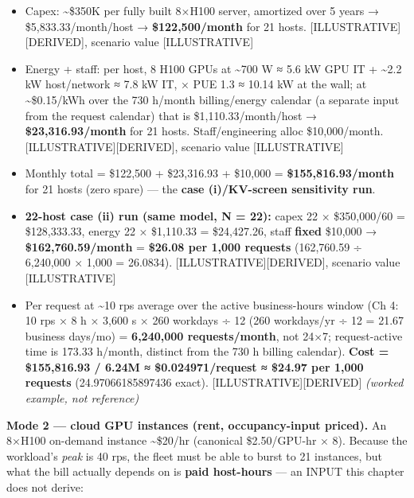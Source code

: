 \begin{itemize}
\tightlist
\item
  Capex: \textasciitilde\$350K per fully built 8×H100 server, amortized
  over 5 years → \$5,833.33/month/host → \textbf{\$122,500/month} for 21
  hosts. \mbox{{[}ILLUSTRATIVE{]}}\hspace{0pt}\mbox{{[}DERIVED{]}}, scenario value
  \mbox{{[}ILLUSTRATIVE{]}}
\item
  Energy + staff: per host, 8 H100 GPUs at \textasciitilde700 W ≈ 5.6 kW
  GPU IT + \textasciitilde2.2 kW host/network ≈ 7.8 kW IT, × PUE 1.3 ≈
  10.14 kW at the wall; at \textasciitilde\$0.15/kWh over the 730
  h/month billing/energy calendar (a separate input from the request
  calendar) that is \$1,110.33/month/host → \textbf{\$23,316.93/month}
  for 21 hosts. Staff/engineering alloc \$10,000/month.
  \mbox{{[}ILLUSTRATIVE{]}}\hspace{0pt}\mbox{{[}DERIVED{]}}, scenario value \mbox{{[}ILLUSTRATIVE{]}}
\item
  Monthly total = \$122,500 + \$23,316.93 + \$10,000 =
  \textbf{\$155,816.93/month} for 21 hosts (zero spare) --- the
  \textbf{case (i)/KV-screen sensitivity run}.
\item
  \textbf{22-host case (ii) run (same model, N = 22):} capex 22 ×
  \$350,000/60 = \$128,333.33, energy 22 × \$1,110.33 = \$24,427.26,
  staff \textbf{fixed} \$10,000 → \textbf{\$162,760.59/month} =
  \textbf{\$26.08 per 1,000 requests} (162,760.59 ÷ 6,240,000 × 1,000 =
  26.0834). \mbox{{[}ILLUSTRATIVE{]}}\hspace{0pt}\mbox{{[}DERIVED{]}}, scenario value
  \mbox{{[}ILLUSTRATIVE{]}}
\item
  Per request at \textasciitilde10 rps average over the active
  business-hours window (Ch 4: 10 rps × 8 h × 3,600 s × 260 workdays ÷
  12 (260 workdays/yr ÷ 12 = 21.67 business days/mo) = \textbf{6,240,000
  requests/month}, not 24×7; request-active time is 173.33 h/month,
  distinct from the 730 h billing calendar). \textbf{Cost = \$155,816.93
  / 6.24M ≈ \$0.024971/request ≈ \$24.97 per 1,000 requests}
  (24.97066185897436 exact). \mbox{{[}ILLUSTRATIVE{]}}\hspace{0pt}\mbox{{[}DERIVED{]}}
  \emph{(worked example, not reference)}
\end{itemize}

\textbf{Mode 2 --- cloud GPU instances (rent, occupancy-input priced).}
An 8×H100 on-demand instance \textasciitilde\$20/hr (canonical
\$2.50/GPU-hr × 8). Because the workload's \emph{peak} is 40 rps, the
fleet must be able to burst to 21 instances, but what the bill actually
depends on is \textbf{paid host-hours} --- an INPUT this chapter does
not derive:

